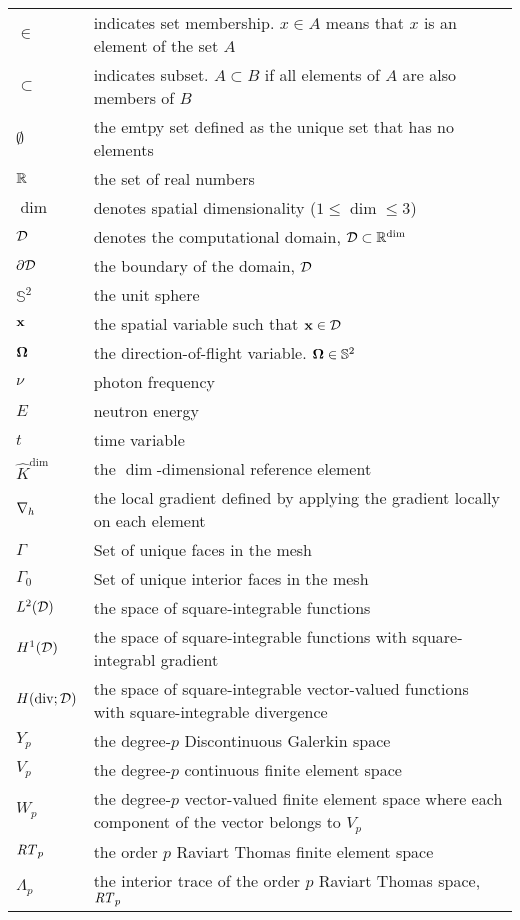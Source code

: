 \documentclass[../doc.tex]{subfiles}
\begin{document}
\begin{longtable}{p{2cm}p{12cm}}
$\in$ & indicates set membership. $x \in A$ means that $x$ is an element of the set $A$\\
$\subset$ & indicates subset. $A \subset B$ if all elements of $A$ are also members of $B$ \\
$\emptyset$ & the emtpy set defined as the unique set that has no elements \\
$\mathbb{R}$ & the set of real numbers \\
$\dim$ & denotes spatial dimensionality ($1\leq \dim \leq 3$) \\
$\mathcal{D}$ & denotes the computational domain, $\mathcal{D} \subset \mathbb{R}^{\dim}$\\ 
$\partial\mathcal{D}$ & the boundary of the domain, $\mathcal{D}$ \\
$\mathbb{S}^2$ & the unit sphere \\
$\boldsymbol{\mathrm{x}}$ & the spatial variable such that $\boldsymbol{\mathrm{x}} \in \mathcal{D}$ \\
$\boldsymbol{\Omega}$ & the direction-of-flight variable. $\boldsymbol{\Omega}\in \mathbb{S}^2$\\
$\nu$ & photon frequency \\
$E$ & neutron energy \\
$t$ & time variable \\

$\hat{K}^{\dim}$ & the $\dim$-dimensional reference element \\
$\nabla_h$ & the local gradient defined by applying the gradient locally on each element \\ 
$\Gamma$ & Set of unique faces in the mesh \\
$\Gamma_0$ & Set of unique interior faces in the mesh \\
$L^2(\mathcal{D})$ & the space of square-integrable functions \\ 
$H^1(\mathcal{D})$ & the space of square-integrable functions with square-integrabl gradient \\ 
$H(\operatorname{div};\mathcal{D})$ & the space of square-integrable vector-valued functions with square-integrable divergence \\ 
$Y_p$ & the degree-$p$ Discontinuous Galerkin space \\
$V_p$ & the degree-$p$ continuous finite element space \\ 
$W_p$ & the degree-$p$ vector-valued finite element space where each component of the vector belongs to $V_p$ \\ 
$\mathit{RT}_p$ & the order $p$ Raviart Thomas finite element space \\ 
$\Lambda_p$ & the interior trace of the order $p$ Raviart Thomas space, $\mathit{RT}_p$ \\


\end{longtable}
\end{document}
